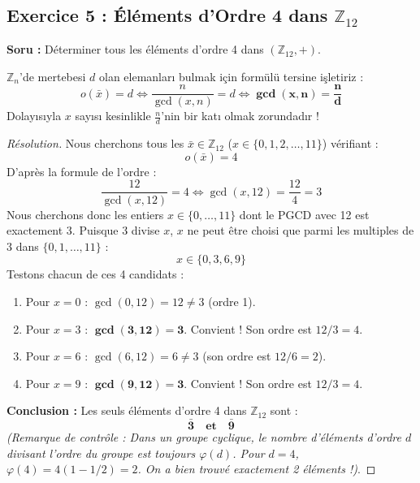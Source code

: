\documentclass[12pt,a4paper]{report}
\begin{document}
\vspace{0.5cm}

\subsection*{Exercice 5 : Éléments d'Ordre 4 dans $\mathbb{Z}_{12}$}
\textbf{Soru :} Déterminer tous les éléments d'ordre 4 dans $(\mathbb{Z}_{12}, +)$.

\begin{tcolorbox}[colback=yellow!5!white,colframe=orange!80!black,title=Sınav Taktiği : İstenen Mertebedeki Elemanları Bulma]
$\mathbb{Z}_n$'de mertebesi $d$ olan elemanları bulmak için formülü tersine işletiriz :
\[ o(\bar{x}) = d \iff \frac{n}{\gcd(x, n)} = d \iff \mathbf{\gcd(x, n) = \frac{n}{d}} \]
Dolayısıyla $x$ sayısı kesinlikle $\frac{n}{d}$'nin bir katı olmak zorundadır !
\end{tcolorbox}

\begin{proof}[Résolution]
Nous cherchons tous les $\bar{x} \in \mathbb{Z}_{12}$ ($x \in \{0, 1, 2, \dots, 11\}$) vérifiant :
\[ o(\bar{x}) = 4 \]
D'après la formule de l'ordre :
\[ \frac{12}{\gcd(x, 12)} = 4 \iff \gcd(x, 12) = \frac{12}{4} = 3 \]
Nous cherchons donc les entiers $x \in \{0, \dots, 11\}$ dont le PGCD avec 12 est exactement 3.
Puisque 3 divise $x$, $x$ ne peut être choisi que parmi les multiples de 3 dans $\{0, 1, \dots, 11\}$ :
\[ x \in \{0, 3, 6, 9\} \]
Testons chacun de ces 4 candidats :
\begin{enumerate}
    \item Pour $x = 0$ : $\gcd(0, 12) = 12 \neq 3$ (ordre 1).
    \item Pour $x = 3$ : $\mathbf{\gcd(3, 12) = 3}$. Convient ! Son ordre est $12/3 = 4$.
    \item Pour $x = 6$ : $\gcd(6, 12) = 6 \neq 3$ (son ordre est $12/6 = 2$).
    \item Pour $x = 9$ : $\mathbf{\gcd(9, 12) = 3}$. Convient ! Son ordre est $12/3 = 4$.
\end{enumerate}
\textbf{Conclusion :} Les seuls éléments d'ordre 4 dans $\mathbb{Z}_{12}$ sont :
\[ \mathbf{\bar{3} \quad \text{et} \quad \bar{9}} \]
\textit{(Remarque de contrôle : Dans un groupe cyclique, le nombre d'éléments d'ordre $d$ divisant l'ordre du groupe est toujours $\varphi(d)$. Pour $d = 4$, $\varphi(4) = 4(1 - 1/2) = 2$. On a bien trouvé exactement 2 éléments !)}.
\end{proof}

\vspace{0.5cm}
\end{document}
